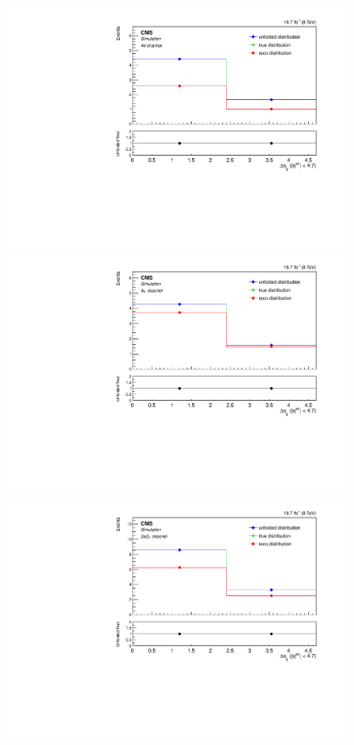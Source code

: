 \begin{figure}[hbtp]
\begin{center}
     \includegraphics[width=0.8\cmsFigWidth]{Figures/Unfolding/MCTests/Deta_ZZTo4e_PowMatrix_PowDistr_FullSample_fr}     
    \includegraphics[width=0.8\cmsFigWidth]{Figures/Unfolding/MCTests/Deta_ZZTo4m_PowMatrix_PowDistr_FullSample_fr}     
    \includegraphics[width=0.8\cmsFigWidth]{Figures/Unfolding/MCTests/Deta_ZZTo2e2m_PowMatrix_PowDistr_FullSample_fr}      

\end{center}
\end{figure}
